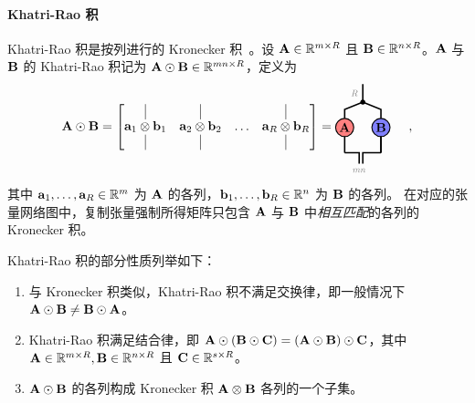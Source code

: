 \paragraph{Khatri-Rao 积}
Khatri-Rao 积是按列进行的 Kronecker 积~\citep{smilde2005multi,bro1998multi}。设 $\mathbf{A}\in\mathbb{R}^{m\times R}$ 且 $\mathbf{B}\in\mathbb{R}^{n\times R}$。$\mathbf{A}$ 与 $\mathbf{B}$ 的 Khatri-Rao 积记为 $\mathbf{A}\odot\mathbf{B}\in\mathbb{R}^{mn\times R}$，定义为
\begin{align*}
    \def\baseline{-0.5ex}
    \Ab\krao\Bb =
    \begin{bmatrix}
    \vline & \vline  &   & \vline \\
    \ab_1\kron\bb_1 & \ab_2\kron\bb_2 & \dots & \ab_R\kron\bb_R\\
    \vline & \vline & & \vline 
    \end{bmatrix}
=
    \begin{tikzpicture}[baseline=\baseline]
    \tikzset{tensor/.style = {minimum size = 0.5cm,shape = circle,thick,draw=black,inner sep = 0pt}, edge/.style   = {thick,line width=.4mm},every loop/.style={}}
    \def\y{0}
    \def\x{0}
    \node[tensor,fill=red!50!white] (A) at (\x,\y){$\Ab$};
    \node[tensor,fill=blue!50!white] (B) at (\x+1,\y){$\Bb$};
    \draw[edge] (\x,\y+0.25) -- (\x,\y+0.5) -- (\x+0.5,\y+0.7);
    \draw[edge] (\x+1,\y+0.25) -- (\x+1,\y+0.5) -- (\x+0.5,\y+0.7);
    \draw[edge] (\x+0.5,\y+0.7) -- (\x+0.5,\y+1.2) node [left, midway] {\edgelabel{$R$}};
    \draw  node[fill = black,circle,inner sep=0pt,minimum size=4pt] (m) at (\x+0.5,\y+0.7) {};
    \draw[edge] (\x,\y-0.25) -- (\x,\y-0.7);
    \draw[edge] (\x+1,\y-0.25) -- (\x+1,\y-0.7);
    \draw[edge] (\x+1,\y-0.7) -- (\x+0.5,\y-0.7) -- (\x+0.5,\y-1);
    \draw[edge] (\x+1,\y-0.25) -- (\x+1,\y-0.7);
    \draw[edge] (\x,\y-0.7) -- (\x+0.4,\y-0.7) -- (\x+0.4,\y-1)node [below] {\edgelabel{$mn$}};
    \end{tikzpicture}\hspace{0.5cm},
\end{align*}
其中 $\mathbf{a}_1,\dots,\mathbf{a}_R\in\mathbb{R}^{m}$ 为 $\mathbf{A}$ 的各列，$\mathbf{b}_1,\dots,\mathbf{b}_R\in\mathbb{R}^{n}$ 为 $\mathbf{B}$ 的各列。  在对应的张量网络图中，复制张量强制所得矩阵只包含 $\mathbf{A}$ 与 $\mathbf{B}$ 中\emph{相互匹配}的各列的 Kronecker 积。 
\begin{remark}
Khatri-Rao 积的部分性质列举如下：
\begin{enumerate}
\item 与 Kronecker 积类似，Khatri-Rao 积不满足交换律，即一般情况下 $\mathbf{A}\odot\mathbf{B}\neq \mathbf{B}\odot\mathbf{A}$。
\item Khatri-Rao 积满足结合律，即 $\mathbf{A}\odot(\mathbf{B}\odot\mathbf{C})=(\mathbf{A}\odot\mathbf{B})\odot\mathbf{C}$，其中 $\mathbf{A}\in\mathbb{R}^{m\times R},\mathbf{B}\in\mathbb{R}^{n\times R}$ 且 $\mathbf{C}\in\mathbb{R}^{s\times R}$。
\item $\mathbf{A}\odot\mathbf{B}$ 的各列构成 Kronecker 积 $\mathbf{A}\otimes \mathbf{B}$ 各列的一个子集。
\end{enumerate}
\end{remark}

